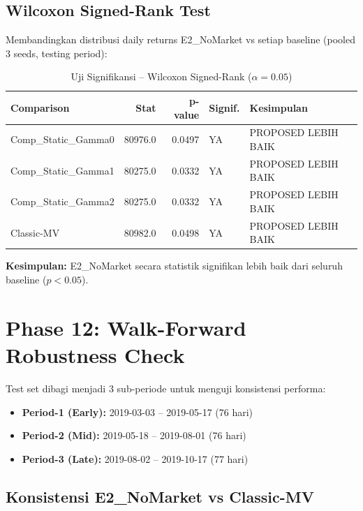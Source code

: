 \documentclass[12pt,a4paper]{article}
\begin{document}
\subsection{Wilcoxon Signed-Rank Test}

Membandingkan distribusi daily returns E2\_NoMarket vs setiap baseline (pooled 3 seeds, testing period):

\begin{table}[h!]
\centering
\begin{tabular}{@{}lrrll@{}}
\toprule
\textbf{Comparison} & \textbf{Stat} & \textbf{p-value} & \textbf{Signif.} & \textbf{Kesimpulan} \\
\midrule
Comp\_Static\_Gamma0 & 80976.0 & 0.0497 & YA & PROPOSED LEBIH BAIK \\
Comp\_Static\_Gamma1 & 80275.0 & 0.0332 & YA & PROPOSED LEBIH BAIK \\
Comp\_Static\_Gamma2 & 80275.0 & 0.0332 & YA & PROPOSED LEBIH BAIK \\
Classic-MV           & 80982.0 & 0.0498 & YA & PROPOSED LEBIH BAIK \\
\bottomrule
\end{tabular}
\caption{Uji Signifikansi -- Wilcoxon Signed-Rank ($\alpha = 0.05$)}
\end{table}

\noindent\textbf{Kesimpulan:} E2\_NoMarket secara statistik signifikan lebih baik dari seluruh baseline ($p < 0.05$).

\section{Phase 12: Walk-Forward Robustness Check}

Test set dibagi menjadi 3 sub-periode untuk menguji konsistensi performa:

\begin{itemize}
  \item \textbf{Period-1 (Early):} 2019-03-03 -- 2019-05-17 (76 hari)
  \item \textbf{Period-2 (Mid):} 2019-05-18 -- 2019-08-01 (76 hari)
  \item \textbf{Period-3 (Late):} 2019-08-02 -- 2019-10-17 (77 hari)
\end{itemize}

\subsection{Konsistensi E2\_NoMarket vs Classic-MV}
\end{document}
